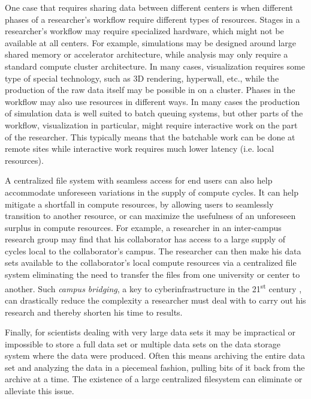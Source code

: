 \documentclass[]{sig-alternate}
\begin{document}
One case that requires sharing data between different centers is when different phases of a researcher's workflow require different types of resources. Stages in a researcher's workflow may require specialized hardware, which might not be available at all centers. For example, simulations may be designed around large shared memory or accelerator architecture, while analysis may only require a standard compute cluster architecture. In many cases, visualization requires some type of special technology, such as 3D rendering, hyperwall, etc., while the production of the raw data itself may be possible in on a cluster. 
Phases in the workflow may also use resources in different ways. In many cases the production of simulation data is well suited to batch queuing systems, but other parts of the workflow, visualization in particular, might require interactive work on the part of the researcher. This typically means that the batchable work can be done at remote sites while interactive work requires much lower latency (i.e. local resources).

A centralized file system with seamless access for end users can also help accommodate unforeseen variations in the supply of compute cycles. It can help mitigate a shortfall in compute resources, by allowing users to seamlessly transition to another resource, or can maximize the usefulness of an unforeseen surplus in compute resources. For example, a researcher in an inter-campus research group may find that his collaborator has access to a large supply of cycles local to the collaborator's campus. The researcher can then make his data sets available to the collaborator's local compute resources via a centralized file system eliminating the need to transfer the files from one university or center to another. Such {\it campus bridging}, a key to cyberinfrastructure in the 21\textsuperscript{st} century \cite{nsf2010}, can drastically reduce the complexity a researcher must deal with to carry out his research and thereby shorten his time to results. 

Finally, for scientists dealing with very large data sets it may be impractical or impossible to store a full data set or multiple data sets on the data storage system where the data were produced. Often this means archiving the entire data set and analyzing the data in a piecemeal fashion, pulling bits of it back from the archive at a time. The existence of a large centralized filesystem can eliminate or alleviate this issue.
\end{document}
